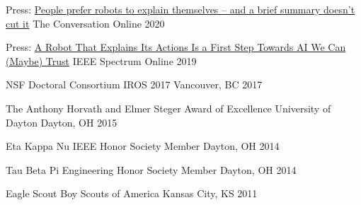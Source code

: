 




\begin{cvhonors}


\cvhonor
{Press: \href{https://theconversation.com/people-prefer-robots-to-explain-themselves-and-a-brief-summary-doesnt-cut-it-129431}{People prefer robots to explain themselves – and a brief summary doesn’t cut it}} %
{The Conversation} %
{Online} %
{2020} %


\cvhonor
{Press: \href{https://spectrum.ieee.org/automaton/robotics/artificial-intelligence/a-robot-that-explains-its-actions}{A Robot That Explains Its Actions Is a First Step Towards AI We Can (Maybe) Trust}} %
{IEEE Spectrum} %
{Online} %
{2019} %


\cvhonor
{NSF Doctoral Consortium} %
{IROS 2017} %
{Vancouver, BC} %
{2017} %


\cvhonor
{The Anthony Horvath and Elmer Steger Award of Excellence} %
{University of Dayton} %
{Dayton, OH} %
{2015} %


\cvhonor
{Eta Kappa Nu IEEE Honor Society} %
{Member} %
{Dayton, OH} %
{2014} %


\cvhonor
{Tau Beta Pi Engineering Honor Society} %
{Member} %
{Dayton, OH} %
{2014} %


\cvhonor
{Eagle Scout} %
{Boy Scouts of America} %
{Kansas City, KS} %
{2011} %


\end{cvhonors}
